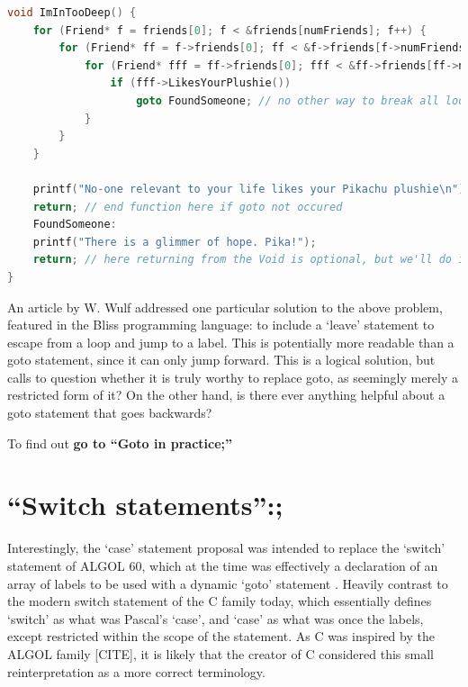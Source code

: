 \documentclass{journal}
\begin{document}
\begin{lstlisting}[language=C,caption={An example of goto used for breaking loops (C)}]
void ImInTooDeep() {
	for (Friend* f = friends[0]; f < &friends[numFriends]; f++) {
		for (Friend* ff = f->friends[0]; ff < &f->friends[f->numFriends]; ff++) {
			for (Friend* fff = ff->friends[0]; fff < &ff->friends[ff->numFriends]; ff++) {
				if (fff->LikesYourPlushie())
					goto FoundSomeone; // no other way to break all loops at once
			}
		}
	}

	printf("No-one relevant to your life likes your Pikachu plushie\n");
	return; // end function here if goto not occured
	FoundSomeone:
	printf("There is a glimmer of hope. Pika!");
	return; // here returning from the Void is optional, but we'll do it for health and safety
}
\end{lstlisting}

An article by W. Wulf \cite{againstgoto} addressed one particular solution to the above problem, featured in the Bliss programming language: to include a `leave' statement to escape from a loop and jump to a label. This is potentially more readable than a goto statement, since it can only jump forward. This is a logical solution, but calls to question whether it is truly worthy to replace goto, as seemingly merely a restricted form of it? On the other hand, is there ever anything helpful about a goto statement that goes backwards?

To find out \textbf{go to ``Goto in practice;''}

\setcounter{section}{1}
\section{``Switch statements'':;}
Interestingly, the `case' statement proposal was intended to replace the `switch' statement of ALGOL 60, which at the time was effectively a declaration of an array of labels to be used with a dynamic `goto' statement \cite{algolguide}. Heavily contrast to the modern switch statement of the C family today, which essentially defines `switch' as what was Pascal's `case', and `case' as what was once the labels, except restricted within the scope of the statement. As C was inspired by the ALGOL family [CITE], it is likely that the creator of C considered this small reinterpretation as a more correct terminology.

\end{document}
